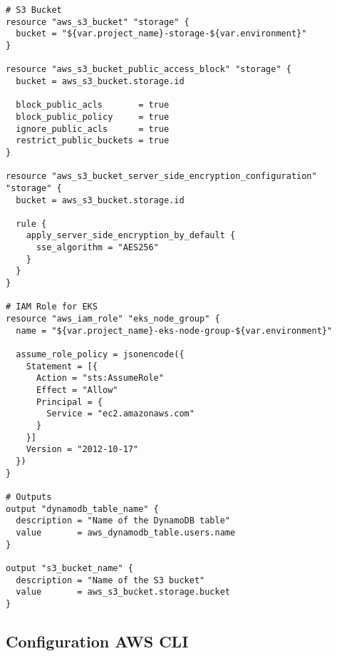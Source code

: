 \begin{lstlisting}[language=HCL, caption=terraform/main.tf]
# S3 Bucket
resource "aws_s3_bucket" "storage" {
  bucket = "${var.project_name}-storage-${var.environment}"
}

resource "aws_s3_bucket_public_access_block" "storage" {
  bucket = aws_s3_bucket.storage.id
  
  block_public_acls       = true
  block_public_policy     = true
  ignore_public_acls      = true
  restrict_public_buckets = true
}

resource "aws_s3_bucket_server_side_encryption_configuration" "storage" {
  bucket = aws_s3_bucket.storage.id
  
  rule {
    apply_server_side_encryption_by_default {
      sse_algorithm = "AES256"
    }
  }
}

# IAM Role for EKS
resource "aws_iam_role" "eks_node_group" {
  name = "${var.project_name}-eks-node-group-${var.environment}"
  
  assume_role_policy = jsonencode({
    Statement = [{
      Action = "sts:AssumeRole"
      Effect = "Allow"
      Principal = {
        Service = "ec2.amazonaws.com"
      }
    }]
    Version = "2012-10-17"
  })
}

# Outputs
output "dynamodb_table_name" {
  description = "Name of the DynamoDB table"
  value       = aws_dynamodb_table.users.name
}

output "s3_bucket_name" {
  description = "Name of the S3 bucket"
  value       = aws_s3_bucket.storage.bucket
}
\end{lstlisting}

\subsection{Configuration AWS CLI}

